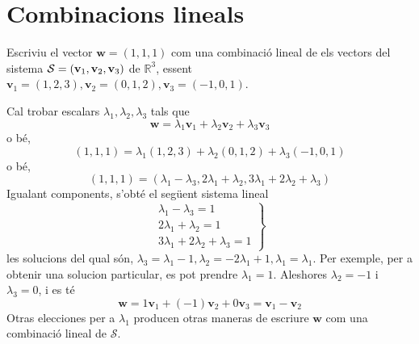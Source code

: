 \section{Combinacions lineals}

\begin{exercici}
Escriviu el vector $\mathbf{w}=(1,1,1)$ com una combinació lineal de
els vectors del sistema $\mathcal{S}=(\mathbf{v}_{1},\mathbf{v}_{2},\mathbf{%
v}_{3})$ de $\mathbb{R}^{3}$, essent $\mathbf{v}_{1}=(1,2,3),\mathbf{v}%
_{2}=(0,1,2),\mathbf{v}_{3}=(-1,0,1)$.

\end{exercici}
\begin{solucio}
Cal trobar escalars $\lambda _{1},\lambda _{2},\lambda _{3}$
tals que%
\begin{equation*}
\mathbf{w}=\lambda _{1}\mathbf{v}_{1}+\lambda _{2}\mathbf{v}_{2}+\lambda _{3}%
\mathbf{v}_{3}
\end{equation*}%
o bé,%
\begin{equation*}
(1,1,1)=\lambda _{1}(1,2,3)+\lambda _{2}(0,1,2)+\lambda _{3}(-1,0,1)
\end{equation*}%
o bé,%
\begin{equation*}
(1,1,1)=(\lambda _{1}-\lambda _{3},2\lambda _{1}+\lambda _{2},3\lambda
_{1}+2\lambda _{2}+\lambda _{3})
\end{equation*}%
Igualant components, s’obté el següent sistema lineal%
\begin{equation*}
\left.
\begin{array}{r}
\lambda _{1}-\lambda _{3}=1 \\
2\lambda _{1}+\lambda _{2}=1 \\
3\lambda _{1}+2\lambda _{2}+\lambda _{3}=1%
\end{array}%
\right\}
\end{equation*}%
les solucions del qual són, $\lambda _{3}=\lambda _{1}-1,\lambda _{2}=-2\lambda
_{1}+1,\lambda _{1}=\lambda _{1}$. Per exemple, per a obtenir una solucion
particular, es pot prendre $\lambda _{1}=1$. Aleshores $\lambda _{2}=-1$ i $%
\lambda _{3}=0$, i es té%
\begin{equation*}
\mathbf{w}=1\mathbf{v}_{1}+(-1)\mathbf{v}_{2}+0\mathbf{v}_{3}=\mathbf{v}_{1}-%
\mathbf{v}_{2}
\end{equation*}%
Otras elecciones per a $\lambda _{1}$ producen otras maneras de escriure $%
\mathbf{w}$ com una combinació lineal de $\mathcal{S}$.
\end{solucio}

